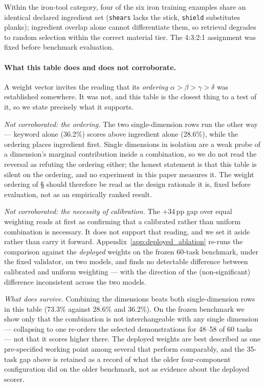 \documentclass[letterpaper]{article} %
\newcommand{\appref}[1]{Appendix~\ref{#1}}
\newcommand{\bodyref}[1]{\getrefnumber{#1}}
\begin{document}
Within the iron-tool category, four of the six iron training examples share
an identical declared ingredient set (\texttt{shears} lacks the stick,
\texttt{shield} substitutes planks); ingredient overlap alone cannot differentiate
them, so retrieval degrades to random selection within the correct
material tier.  The 4:3:2:1 assignment was fixed before benchmark
evaluation.

\paragraph{What this table does and does not corroborate.}  A weight vector
invites the reading that its \emph{ordering}
$\alpha{>}\beta{>}\gamma{>}\delta$ was established somewhere.  It was not, and
this table is the closest thing to a test of it, so we state precisely what it
supports.

\emph{Not corroborated: the ordering.}  The two single-dimension rows
run the other way --- keyword alone (36.2\%) scores above ingredient
alone (28.6\%), while the ordering places ingredient first.  Single
dimensions in isolation are a weak probe of a dimension's marginal
contribution inside a combination, so we do not read the reversal as
refuting the ordering either; the honest statement is that this table
is silent on the ordering, and no experiment in this paper measures it.
The weight ordering of \S\bodyref{sec:scoring} should therefore be read as the
design rationale it is, fixed before evaluation, not as an empirically
ranked result.

\emph{Not corroborated: the necessity of calibration.}  The $+$34\,pp
gap over equal weighting reads at first as confirming that a
calibrated rather than uniform combination is necessary.  It does not
support that reading, and we set it aside rather than carry it
forward.  \appref{app:deployed_ablation} re-runs
the comparison against the \emph{deployed} weights on the frozen
60-task benchmark, under the fixed validator, on two models, and finds
no detectable difference between calibrated and uniform weighting ---
with the direction of the (non-significant) difference inconsistent
across the two models.

\emph{What does survive.}  Combining the dimensions beats both
single-dimension rows in this table (73.3\% against 28.6\% and 36.2\%).
On the frozen benchmark we show only that the combination is not interchangeable
with any single dimension --- collapsing to one re-orders the selected
demonstrations for 48--58 of 60 tasks --- not that it scores higher there.  The deployed
weights are best described as one pre-specified working point among
several that perform comparably, and the 35-task gap above is retained
as a record of what the older four-component configuration did on the
older benchmark, not as evidence about the deployed scorer.
\end{document}
